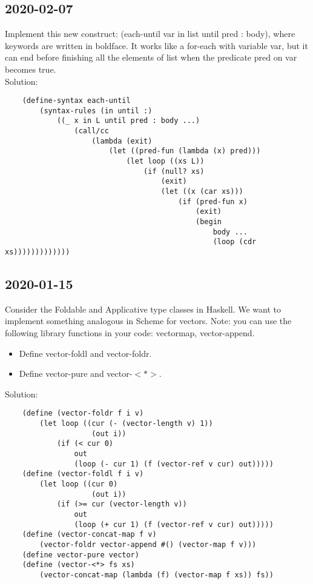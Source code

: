 \subsection{2020-02-07}
Implement this new construct: (each-until var in list until pred : body), where keywords are written in
boldface. It works like a for-each with variable var, but it can end before finishing all the elements of list
when the predicate pred on var becomes true.\\
Solution:
\begin{lstlisting}
	(define-syntax each-until
		(syntax-rules (in until :)
			((_ x in L until pred : body ...)
				(call/cc
					(lambda (exit)
						(let ((pred-fun (lambda (x) pred)))
							(let loop ((xs L))
								(if (null? xs)
									(exit)
									(let ((x (car xs)))
										(if (pred-fun x)
											(exit)
											(begin
												body ...
												(loop (cdr xs)))))))))))))
\end{lstlisting}





\subsection{2020-01-15}
Consider the Foldable and Applicative type classes in Haskell. We want to implement something
analogous in Scheme for vectors. Note: you can use the following library functions in your code: vectormap, vector-append.
\begin{itemize}
    \item Define vector-foldl and vector-foldr.
    \item Define vector-pure and vector-$<*>$.
\end{itemize}
Solution:
\begin{lstlisting}
    (define (vector-foldr f i v)
        (let loop ((cur (- (vector-length v) 1))
                    (out i))
            (if (< cur 0)
                out
                (loop (- cur 1) (f (vector-ref v cur) out)))))
    (define (vector-foldl f i v)
        (let loop ((cur 0)
                    (out i))
            (if (>= cur (vector-length v))
                out
                (loop (+ cur 1) (f (vector-ref v cur) out)))))
    (define (vector-concat-map f v)
        (vector-foldr vector-append #() (vector-map f v)))
    (define vector-pure vector)
    (define (vector-<*> fs xs)
        (vector-concat-map (lambda (f) (vector-map f xs)) fs))
\end{lstlisting}







